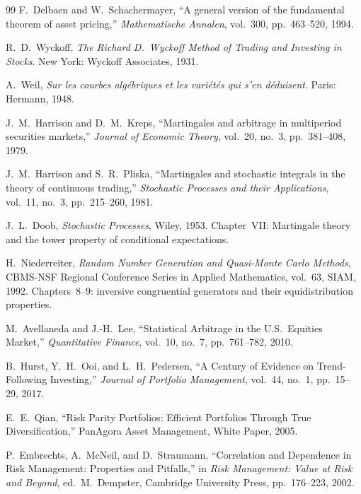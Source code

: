 \begin{thebibliography}{99}
F.~Delbaen and W.~Schachermayer,
``A general version of the fundamental theorem of asset pricing,''
\emph{Mathematische Annalen}, vol.~300, pp.~463--520, 1994.

R.~D.~Wyckoff,
\emph{The Richard D.~Wyckoff Method of Trading and Investing in Stocks}.
New York: Wyckoff Associates, 1931.

A.~Weil,
\emph{Sur les courbes alg\'ebriques et les vari\'et\'es qui s'en d\'eduisent}.
Paris: Hermann, 1948.

J.~M.~Harrison and D.~M.~Kreps,
``Martingales and arbitrage in multiperiod securities markets,''
\emph{Journal of Economic Theory}, vol.~20, no.~3, pp.~381--408, 1979.

J.~M.~Harrison and S.~R.~Pliska,
``Martingales and stochastic integrals in the theory of continuous trading,''
\emph{Stochastic Processes and their Applications}, vol.~11, no.~3, pp.~215--260, 1981.

J.~L.~Doob,
\emph{Stochastic Processes},
Wiley, 1953.
Chapter~VII: Martingale theory and the tower property of conditional expectations.

H.~Niederreiter,
\emph{Random Number Generation and Quasi-Monte Carlo Methods},
CBMS-NSF Regional Conference Series in Applied Mathematics, vol.~63, SIAM, 1992.
Chapters~8--9: inversive congruential generators and their equidistribution properties.

M.~Avellaneda and J.-H.~Lee,
``Statistical Arbitrage in the U.S.\ Equities Market,''
\emph{Quantitative Finance}, vol.~10, no.~7, pp.~761--782, 2010.

B.~Hurst, Y.~H.~Ooi, and L.~H.~Pedersen,
``A Century of Evidence on Trend-Following Investing,''
\emph{Journal of Portfolio Management}, vol.~44, no.~1, pp.~15--29, 2017.

E.~E.~Qian,
``Risk Parity Portfolios: Efficient Portfolios Through True Diversification,''
PanAgora Asset Management, White Paper, 2005.

P.~Embrechts, A.~McNeil, and D.~Straumann,
``Correlation and Dependence in Risk Management: Properties and Pitfalls,''
in \emph{Risk Management: Value at Risk and Beyond}, ed.\ M.~Dempster,
Cambridge University Press, pp.~176--223, 2002.


\end{thebibliography}
